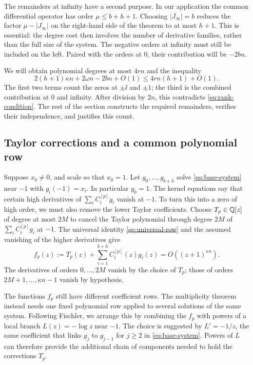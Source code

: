 The remainders at infinity have a second purpose. In our application the
common differential operator has order $\mu\leq b+h+1$. Choosing
$|J_\infty|=b$ reduces the factor $\mu-|J_\infty|$ on the right-hand
side of the theorem to at most $h+1$. This is essential: the degree cost
then involves the number of derivative families, rather than the full
size of the system. The negative orders at infinity must still be
included on the left. Paired with the orders at $0$, their contribution
will be $-2bn$.

We will obtain polynomial degrees at most $4rn$ and the inequality
\[
 2(h+1)\kappa n+2\omega n-2bn+O(1)
       \leq 4rn(h+1)+O(1).
\]
The first two terms count the zeros at $\pm\ii$ and $\pm1$;
the third is the combined contribution at $0$ and infinity.
After division by $2n$, this contradicts \eqref{eq:rank-condition}.
The rest of the section constructs the required remainders, verifies
their independence, and justifies this count.

\subsection{Taylor corrections and a common polynomial row}

Suppose $x_0\neq0$, and scale so that $x_0=1$.
Let $g_0,\ldots,g_{b+h}$ solve \eqref{eq:base-system} near $-1$ with
$g_i(-1)=x_i$. In particular $g_0=1$.
The kernel equations say that certain high derivatives of
$\sum_i C_i^{[p]}g_i$ vanish at $-1$. To turn this into a zero of high
order, we must also remove the lower Taylor coefficients.
Choose $T_p\in\mathbb Q[z]$ of degree at most $2M$ to cancel the Taylor polynomial
through degree $2M$ of $\sum_i C_i^{[p]}g_i$ at $-1$.
The universal identity \eqref{eq:universal-row} and the assumed vanishing
of the higher derivatives give
\begin{equation}\label{eq:f-zero}
 f_p(z):=T_p(z)+\sum_{i=1}^{b+h}C_i^{[p]}(z)g_i(z)
          =O((z+1)^{\kappa n}).
\end{equation}
The derivatives of orders $0,\ldots,2M$ vanish by the choice of $T_p$;
those of orders $2M+1,\ldots,\kappa n-1$ vanish by hypothesis.

The functions $f_p$ still have different coefficient rows. The
multiplicity theorem instead needs one fixed polynomial row applied to
several solutions of the same system. Following Fischler, we arrange
this by combining the $f_p$ with powers of a local branch
$L(z)=-\log z$ near $-1$. The choice is suggested by $L'=-1/z$,
the same coefficient that links $g_j$ to $g_{j-1}$ for $j\geq2$ in
\eqref{eq:base-system}. Powers of $L$ can therefore provide the
additional chain of components needed to hold the corrections $T_p$.

